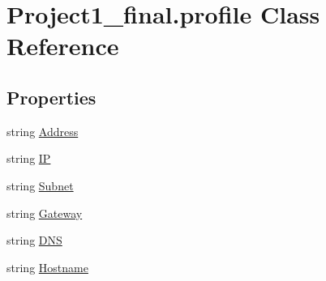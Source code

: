 \hypertarget{class_project1__final_1_1profile}{\section{Project1\+\_\+final.\+profile Class Reference}
\label{class_project1__final_1_1profile}
}
\subsection*{Properties}
\begin{DoxyCompactItemize}
\item 
string \hyperlink{class_project1__final_1_1profile_ac862dd6d9bb4eb00a7cc2d3bcfb71cb1}{Address}
\item 
string \hyperlink{class_project1__final_1_1profile_a7354777c5baffe025ba85505c07bbf4a}{I\+P}
\item 
string \hyperlink{class_project1__final_1_1profile_a8844e220fb9d0f6321abbc464aae1bbd}{Subnet}
\item 
string \hyperlink{class_project1__final_1_1profile_a0fefe32ecbb059f8aa32b7f0ceaf1d76}{Gateway}
\item 
string \hyperlink{class_project1__final_1_1profile_aeae5c56b3798d9d9569c0b30e2ee7e53}{D\+N\+S}
\item 
string \hyperlink{class_project1__final_1_1profile_aa3b274fa3b1597a1c55dd075aaf60e53}{Hostname}
\end{DoxyCompactItemize}


